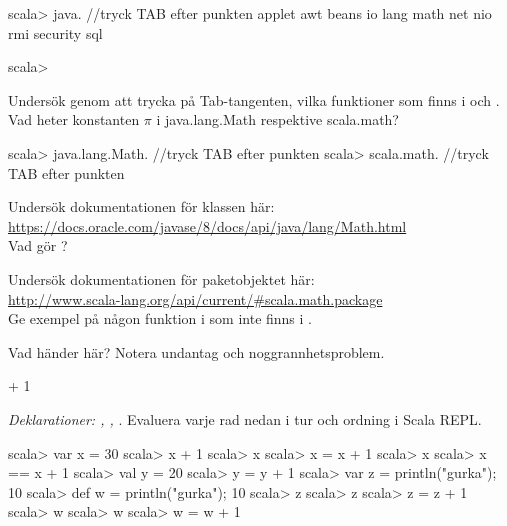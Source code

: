 \begin{REPL}
scala> java.    //tryck TAB efter punkten
applet   awt   beans   io   lang   math   net   nio   rmi   security   sql

scala>
\end{REPL}

\Subtask Undersök genom att trycka på Tab-tangenten, vilka funktioner som finns i  och . Vad heter konstanten $\pi$ i java.lang.Math respektive scala.math?

\begin{REPL}
scala> java.lang.Math.    //tryck TAB efter punkten
scala> scala.math.        //tryck TAB efter punkten
\end{REPL}

\Subtask Undersök dokumentationen för klassen  här: \\ \url{https://docs.oracle.com/javase/8/docs/api/java/lang/Math.html} \\
Vad gör ?

\Subtask Undersök dokumentationen för paketobjektet  här: \\
\url{http://www.scala-lang.org/api/current/#scala.math.package} \\
Ge exempel på någon funktion i  som inte finns i .


\Task Vad händer här? Notera undantag  och noggrannhetsproblem. %

\Subtask {} + 1

\Subtask {}

\Subtask {}

\Subtask {}

\Subtask {}

\Subtask {}

\Subtask {}

\Subtask {}

\Subtask {}

\Subtask {}





\Task \textit{Deklarationer: , , }. Evaluera varje rad nedan i tur och ordning i Scala REPL.  %
\begin{REPL}[numbers=left, numberstyle=\color{black}\ttfamily\scriptsize\selectfont]
scala> var x = 30
scala> x + 1
scala> x
scala> x = x + 1
scala> x
scala> x == x + 1
scala> val y = 20
scala> y = y + 1
scala> var z = {println("gurka"); 10}
scala> def w = {println("gurka"); 10}
scala> z
scala> z
scala> z = z + 1
scala> w
scala> w
scala> w = w + 1
\end{REPL}

